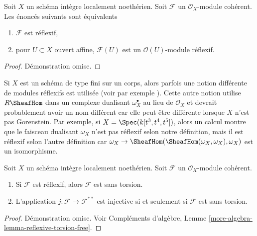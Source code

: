 \begin{lemma}
\label{lemma-check-reflexive-on-affines}
Soit  $X$  un schéma intègre localement noethérien. Soit  $\mathcal{F}$  un
 $\mathcal{O}_X$-module cohérent. Les énoncés suivants sont équivalents
\begin{enumerate}
\item $\mathcal{F}$  est réflexif,
\item pour  $U \subset X$  ouvert affine,  $\mathcal{F}(U)$  est un  $\mathcal{O}(U)$-module réflexif.
\end{enumerate}
\end{lemma}

\begin{proof}
Démonstration omise.
\end{proof}

\begin{remark}
\label{remark-different-reflexive}
Si  $X$  est un schéma de type fini sur un corps, alors parfois une notion
différente de modules réflexifs est utilisée (voir par exemple \cite[bas de la page 5 et définition 1.1.9]{HL}).
Cette autre notion utilise  $R\SheafHom$  dans un complexe dualisant  $\omega_X^\bullet$  au
 lieu de  $\mathcal{O}_X$  et devrait probablement avoir un nom différent car elle
peut être différente lorsque  $X$  n'est pas Gorenstein. Par exemple, si
 $X = \Spec(k[t^3, t^4, t^5])$, alors un calcul montre que le faisceau dualisant  $\omega_X$  n'est pas
réflexif selon notre définition, mais il est réflexif selon l'autre définition car
 $\omega_X \to \SheafHom(\SheafHom(\omega_X, \omega_X), \omega_X)$  est un isomorphisme.
\end{remark}

\begin{lemma}
\label{lemma-reflexive-torsion-free}
Soit  $X$  un schéma intègre localement noethérien. Soit  $\mathcal{F}$  un
 $\mathcal{O}_X$-module cohérent.
\begin{enumerate}
\item Si  $\mathcal{F}$  est réflexif, alors  $\mathcal{F}$  est sans torsion.
\item L'application  $j : \mathcal{F} \longrightarrow \mathcal{F}^{**}$  est injective si et seulement si  $\mathcal{F}$  est sans
torsion.
\end{enumerate}
\end{lemma}

\begin{proof}
Démonstration omise. Voir Compléments d'algèbre, Lemme  \ref{more-algebra-lemma-reflexive-torsion-free}.
\end{proof}

